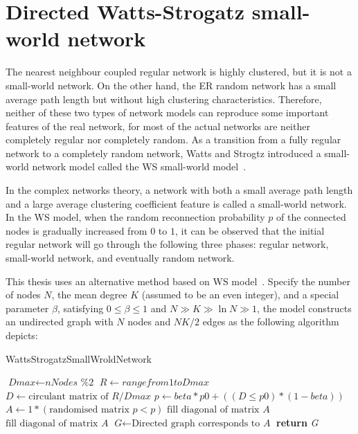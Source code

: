 \section{Directed Watts-Strogatz small-world network}
The nearest neighbour coupled regular network is highly clustered, but it is not a small-world network. On the other hand, the ER random network has a small average path length but without high clustering characteristics. Therefore, neither of these two types of network models can reproduce some important features of the real network, for most of the actual networks are neither completely regular nor completely random. As a transition from a fully regular network to a completely random network, Watts and Strogtz introduced a small-world network model called the WS small-world model~\cite{watts1998collective}.


In the complex networks theory, a network with both a small average path length and a large average clustering coefficient feature is called a small-world network. In the WS model, when the random reconnection probability $p$ of the connected nodes is gradually increased from $0$ to $1$, it can be observed that the initial regular network will go through the following three phases: regular network, small-world network, and eventually random network.

This thesis uses an alternative method based on WS model~\cite{song2014simple}. Specify the number of nodes $N$, the mean degree $K$ (assumed to be an even integer), and a special parameter $\beta$, satisfying $0\leq \beta \leq 1$ and $N\gg K\gg \ln N\gg 1$, the model constructs an undirected graph with $N$ nodes and ${NK}/{2}$ edges as the following algorithm depicts:

\begin{algorithm}[H]
	\caption{WattsStrogatzSmallWroldNetwork}\label{alg:smallworld}
	\begin{algorithmic}[1]
		\State $\textit{Dmax} \gets \textit{nNodes \% 2}$
		\State $\textit{R} \gets range from 1 to \textit{Dmax}$
		\State $\textit{D} \gets \text{circulant matrix of } \textit{R}/\textit{Dmax}$
		\State $\textit{p} \gets \textit{beta}*\textit{p0}+((\textit{D} \leq \textit{p0})*(1-\textit{beta}))$
		\State $\textit{A} \gets 1*(\text{randomised matrix }\textit{p} < p)$
		\State $\text{fill diagonal of matrix }\textit{A}$
		\State $\text{fill diagonal of matrix }\textit{A}$
		\State $\textit{G} \gets \text{Directed graph corresponds to }\textit{A}$
		\State \textbf{return} {\textit{G}}
		\EndProcedure
	\end{algorithmic}
\end{algorithm}

